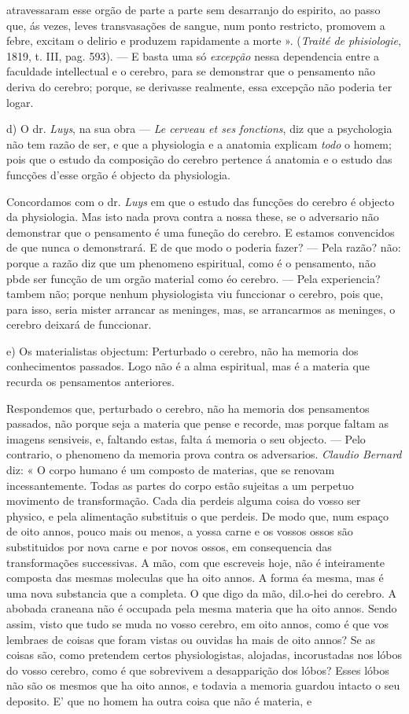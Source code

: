 atravessaram esse orgão de parte a parte sem desarranjo do espirito, ao passo que, ás vezes, leves transvasações de sangue, num ponto restricto, promovem a febre, excitam o delirio e produzem rapidamente a morte ». (\emph{Traité de phisiologie}, 1819, t. III, pag. 593). --- E basta uma só \emph{excepção} nessa dependencia entre a faculdade intellectual e o cerebro, para se demonstrar que o pensamento não deriva do cerebro; porque, se derivasse realmente, essa excepção não poderia ter logar.\par d) O dr. \emph{Luys}, na sua obra --- \emph{Le cerveau et ses fonctions}, diz que a psychologia não tem razão de ser, e que a physiologia e a anatomia explicam \emph{todo} o homem; pois que o estudo da composição do cerebro pertence á anatomia e o estudo das funcções d'esse orgão é objecto da physiologia.\par Concordamos com o dr. \emph{Luys} em que o estudo das funcções do cerebro é objecto da physiologia. Mas isto nada prova contra a nossa these, se o adversario não demonstrar que o pensamento é uma funeção do cerebro. E estamos convencidos de que nunca o demonstrará. E de que modo o poderia fazer? --- Pela razão? não: porque a razão diz que um phenomeno espiritual, como é o pensamento, não pbde ser funcção de um orgão material como éo cerebro. --- Pela experiencia? tambem não; porque nenhum physiologista viu funccionar o cerebro, pois que, para isso, seria mister arrancar as meninges, mas, se arrancarmos as meninges, o cerebro deixará de funccionar.\par e) Os materialistas objectum: Perturbado o cerebro, não ha memoria dos conhecimentos passados. Logo não é a alma espiritual, mas é a materia que recurda os pensamentos anteriores.\par Respondemos que, perturbado o cerebro, não ha memoria dos pensamentos passados, não porque seja a materia que pense e recorde, mas porque faltam as imagens sensiveis, e, faltando estas, falta á memoria o seu objecto. --- Pelo contrario, o phenomeno da memoria prova contra os adversarios. \emph{Claudio Bernard} diz: « O corpo humano é um composto de materias, que se renovam incessantemente. Todas as partes do corpo estão sujeitas a um perpetuo movimento de transformação. Cada dia perdeis alguma coisa do vosso ser physico, e pela alimentação substituis o que perdeis. De modo que, num espaço de oito annos, pouco mais ou menos, a yossa carne e os vossos ossos são substituidos por nova carne e por novos ossos, em consequencia das transformações successivas. A mão, com que escreveis hoje, não é inteiramente composta das mesmas moleculas que ha oito annos. A forma éa mesma, mas é uma nova substancia que a completa. O que digo da mão, dil.o-hei do cerebro. A abobada craneana não é occupada pela mesma materia que ha oito annos. Sendo assim, visto que tudo se muda no vosso cerebro, em oito annos, como é que vos lembraes de coisas que foram vistas ou ouvidas ha mais de oito annos? Se as coisas são, como pretendem certos physiologistas, alojadas, incorustadas nos lóbos do vosso cerebro, como é que sobrevivem a desapparição dos lóbos? Esses lóbos não são os mesmos que ha oito annos, e todavia a memoria guardou intacto o seu deposito. E' que no homem ha outra coisa que não é materia, e 